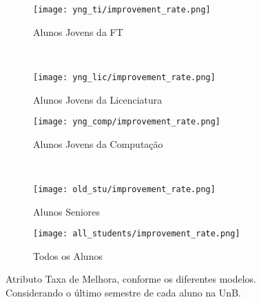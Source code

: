 \clearpage
\begin{figure}[!ht]
    \centering
    \begin{subfigure}[b]{0.48\textwidth}
        \centering
        \texttt{[image: yng\_ti/improvement\_rate.png]}
        \caption{Alunos Jovens da FT}
    \end{subfigure}
    ~
    \begin{subfigure}[b]{0.48\textwidth}
        \centering
        \texttt{[image: yng\_lic/improvement\_rate.png]}
        \caption{Alunos Jovens da Licenciatura}
    \end{subfigure}

    \begin{subfigure}[b]{0.48\textwidth}
        \centering
        \texttt{[image: yng\_comp/improvement\_rate.png]}
        \caption{Alunos Jovens da Computação}
    \end{subfigure}
    ~
    \begin{subfigure}[b]{0.48\textwidth}
        \centering
        \texttt{[image: old\_stu/improvement\_rate.png]}
        \caption{Alunos Seniores}
    \end{subfigure}

    \begin{subfigure}[b]{0.48\textwidth}
        \centering
        \texttt{[image: all\_students/improvement\_rate.png]}
        \caption{Todos os Alunos}
    \end{subfigure}
    \caption{Atributo Taxa de Melhora, conforme os diferentes modelos. Considerando o
    último semestre de cada aluno na UnB.}
\end{figure}


